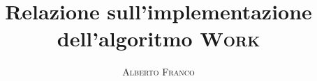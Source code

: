 \documentclass[a4paper, 10pt]{article}
\begin{document}
    \title{Relazione sull'implementazione dell'algoritmo \textsc{Work}}
    \author{\textsc{Alberto Franco}}
    \maketitle
    
    
\end{document}
